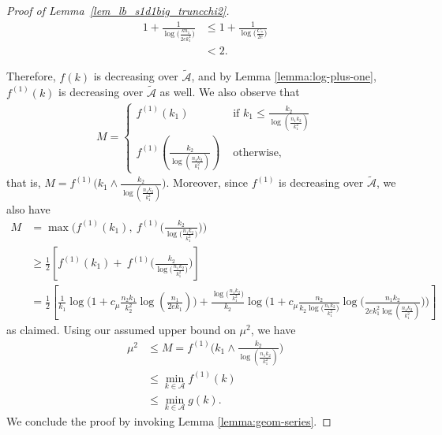 \documentclass{article}
\newcommand{\cA}{\mathcal{A}}
\newcommand{\Ct}{C_{*}}
\begin{document}
\begin{proof}[Proof of Lemma~\ref{lem_lb_s1d1big_truncchi2}]
    \begin{align*}
        1 + \frac{1}{\log \big(\frac{kn_1}{2ek_1^2}\big)} &\leq 1 + \frac{1}{\log\big(\frac{\Ct}{2e}\big)} \\
        &< 2.
    \end{align*}

    Therefore, $f(k)$ is decreasing over $\widetilde{\mathcal{A}}$, and by Lemma \ref{lemma:log-plus-one}, $f^{(1)}(k)$ is decreasing over $\widetilde{\mathcal{A}}$ as well. 
    We also observe that 
    \begin{align*}
        M = \begin{cases} f^{(1)}(k_1) & \text{ if } k_1 \leq \frac{k_2}{\log(\frac{n_1k_2}{k_1^2})}\\
        f^{(1)}(\frac{k_2}{\log(\frac{n_1k_2}{k_1^2})}) & \text{ otherwise,}
        \end{cases}
    \end{align*}
    that is, $M= f^{(1)}\Big(k_1 \land \frac{k_2}{\log(\frac{n_1k_2}{k_1^2})}\Big)$. 
    Moreover, since $f^{(1)}$ is decreasing over $\widetilde{\mathcal{A}}$, we also have
    \begin{align*}
        M &= \max\bigg(f^{(1)}(k_1), ~f^{(1)}\bigg(\frac{k_2}{\log\big(\frac{n_1k_2}{k_1^2}\big)}\bigg)\bigg) \\
        &\geq \frac{1}{2} \left[f^{(1)}(k_1) + ~f^{(1)}\bigg(\frac{k_2}{\log\big(\frac{n_1k_2}{k_1^2}\big)}\bigg)\right]\\
        & = \frac{1}{2} \left[\frac{1}{k_1}\log\Big(1 + c_\mu \frac{n_2k_1}{k_2^2}\log(\frac{n_1}{2ek_1})\Big) + \frac{\log\big(\frac{n_1k_2}{k_1^2}\big)}{k_2}\log\Big(1 + c_\mu \frac{n_2}{k_2\log\big(\frac{n_1k_2}{k_1^2}\big)}\log\big(\frac{n_1k_2}{2ek_1^2\log(\frac{n_1k_2}{k_1^2})}\big)\Big)\right]
    \end{align*}
    as claimed. 
    Using our assumed upper bound on $\mu^2$, we have 
    \begin{align*}
        \mu^2 &\leq M =  f^{(1)}\bigg(k_1 \land \frac{k_2}{\log(\frac{n_1k_2}{k_1^2})}\bigg) \\
        &\leq \min_{k \in \cA}f^{(1)}(k) \\
        &\leq \min_{k\in \cA}g(k).
    \end{align*}
    We conclude the proof by invoking Lemma \ref{lemma:geom-series}. 
\end{proof}
\end{document}

